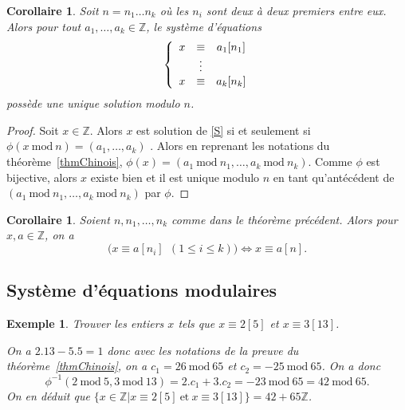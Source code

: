 \documentclass[12pt]{report}
\newtheorem*{ex}{Exemple}
\newtheorem{Cor}[thm]{Corollaire}
\newcommand{\Z}{\mathbb{Z}}
\begin{document}
\begin{Cor}
Soit $n=n_1 \ldots n_k$ où les $n_i$ sont deux à deux premiers entre eux. Alors pour tout $a_1, \ldots, a_k \in \mathbb{Z}$, le système d'équations 
\begin{equation}{\color{red}\label{S}}
\left \{ \begin{array}{ccc}
x & \equiv & a_1 [n_1] \\
  &      \vdots    &   \\
x & \equiv & a_k [n_k]   
\end{array}   \right.
\end{equation}
possède une unique solution modulo $n$.
\end{Cor}

\begin{proof}
Soit $x\in \Z$. Alors $x$ est solution de  \eqref{S} si et seulement si $\phi(x\mathrm{\ mod\ }n)=(a_1,\ldots, a_k)$ . Alors en reprenant les notations du théorème~\ref{thmChinois}, $\phi(x)=(a_1\mathrm{\ mod \ }n_1, \ldots, a_k\mathrm{\ mod\ }n_k)$. Comme $\phi$ est bijective, alors $x$ existe bien et il est unique modulo $n$ en tant qu'antécédent de $(a_1\mathrm{\ mod \ }n_1, \ldots, a_k\mathrm{\ mod\ }n_k)$ par $\phi$. 
\end{proof}

\begin{Cor}
Soient $n, n_1, \ldots, n_k$ comme dans le théorème précédent. Alors pour $x,a\in \Z$, on a 
$$ \big( x \equiv a [n_i] \ \ (1 \leq  i \leq k)    \big) \Longleftrightarrow x \equiv a [n]  .     $$
\end{Cor}



\subsection*{Système d'équations modulaires}

\begin{ex}
Trouver les entiers $x$ tels que $x\equiv 2 [5]$ et $x \equiv 3 [13]  $.\par 

On a $2.13-5.5=1$ donc avec les notations de la preuve du théorème~\ref{thmChinois}, on a $c_1=26\mathrm{\ mod \ }65$ et $c_2=-25\mathrm{\ mod\ }65$. On a donc \[\phi^{-1}(2\mathrm{\ mod\ }5,3\mathrm{\ mod\ }13)=2.c_1+3.c_2=-23\mathrm{\ mod\ }65=42\mathrm{\ mod\ }65.\] On en déduit que $\{x\in \Z| x\equiv 2[5]\mathrm{\ et\ }x\equiv 3[13]\}=42+65\Z$.
\end{ex}
\end{document}
